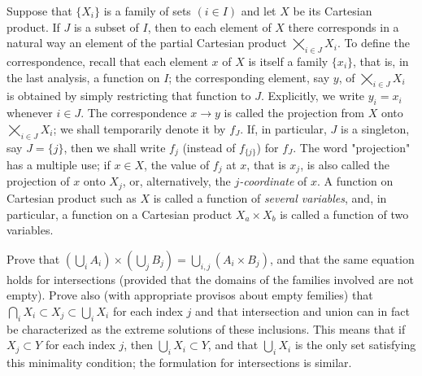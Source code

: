 Suppose that $\{ X_{i} \}$ is a family of sets $(i \in I)$ and let $X$ be its Cartesian product. If $J$ is a subset of $I$, then to each element of $X$ there corresponds in a natural way an element of the partial Cartesian product $\bigtimes_{i \in J}X_{i}$. To define the correspondence, recall that each element $x$ of $X$ is itself a family $\{ x_{i} \}$, that is, in the last analysis, a function on $I$; the corresponding element, say $y$, of $\bigtimes_{i \in J}X_{i}$ is obtained by simply restricting that function to $J$. Explicitly, we write $y_{i} = x_{i}$ whenever $i \in J$. The correspondence $x \rightarrow y$ is called the projection from $X$ onto $\bigtimes_{i \in J}X_{i}$; we shall temporarily denote it by $f_{J}$. If, in particular, $J$ is a singleton, say $J = \{ j \}$, then we shall write $f_{j}$ (instead of $f_{ \{j \} }$) for $f_{J}$. The word "projection" has a multiple use; if $x \in X$, the value of $f_{j}$ at $x$, that is $x_{j}$, is also called the projection of $x$ onto $X_{j}$, or, alternatively, the \textit{$j$-coordinate} of $x$. A function on Cartesian product such as $X$ is called a function of \textit{several variables}, and, in particular, a function on a Cartesian product $X_{a} \times X_{b}$ is called a function of two variables. 

\begin{exercise} Prove that $(\bigcup_{i}A_{i}) \times (\bigcup_{j}B_{j}) = \bigcup_{i,j}(A_{i} \times B_{j})$, and that the same equation holds for intersections (provided that the domains of the families involved are not empty). Prove also (with appropriate provisos about empty femilies) that $\bigcap_{i}X_{i} \subset X_{j} \subset \bigcup_{i}X_{i}$ for each index $j$ and that intersection and union can in fact be characterized as the extreme solutions of these inclusions. This means that if $X_{j} \subset Y$ for each index $j$, then $\bigcup_{i}X_{i} \subset Y$, and that $\bigcup_{i}X_{i}$ is the only set satisfying this minimality condition; the formulation for intersections is similar.
\end{exercise}